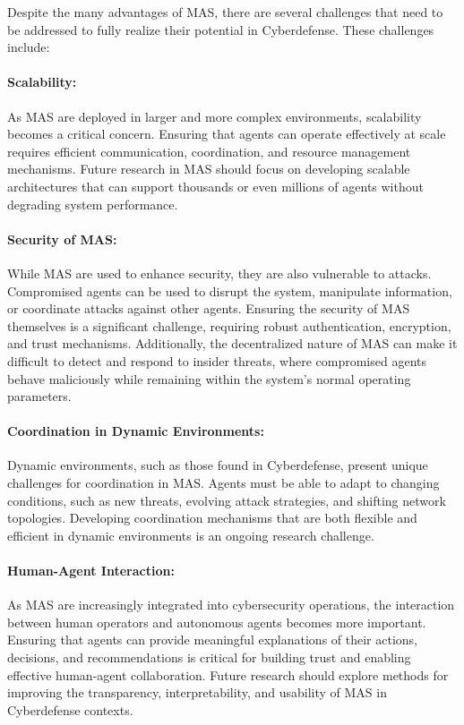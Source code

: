 Despite the many advantages of MAS, there are several challenges that need to be addressed to fully realize their potential in Cyberdefense. These challenges include:

\paragraph{Scalability:}
As MAS are deployed in larger and more complex environments, scalability becomes a critical concern. Ensuring that agents can operate effectively at scale requires efficient communication, coordination, and resource management mechanisms. Future research in MAS should focus on developing scalable architectures that can support thousands or even millions of agents without degrading system performance.

\paragraph{Security of MAS:}
While MAS are used to enhance security, they are also vulnerable to attacks. Compromised agents can be used to disrupt the system, manipulate information, or coordinate attacks against other agents. Ensuring the security of MAS themselves is a significant challenge, requiring robust authentication, encryption, and trust mechanisms. Additionally, the decentralized nature of MAS can make it difficult to detect and respond to insider threats, where compromised agents behave maliciously while remaining within the system's normal operating parameters.

\paragraph{Coordination in Dynamic Environments:}
Dynamic environments, such as those found in Cyberdefense, present unique challenges for coordination in MAS. Agents must be able to adapt to changing conditions, such as new threats, evolving attack strategies, and shifting network topologies. Developing coordination mechanisms that are both flexible and efficient in dynamic environments is an ongoing research challenge.

\paragraph{Human-Agent Interaction:}
As MAS are increasingly integrated into cybersecurity operations, the interaction between human operators and autonomous agents becomes more important. Ensuring that agents can provide meaningful explanations of their actions, decisions, and recommendations is critical for building trust and enabling effective human-agent collaboration. Future research should explore methods for improving the transparency, interpretability, and usability of MAS in Cyberdefense contexts.



